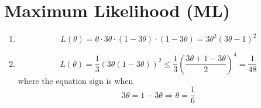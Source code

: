 
\section{Maximum Likelihood (ML)}

\begin{enumerate}
\item 
\[
L(\theta) = \theta\cdot 3\theta\cdot (1-3\theta)\cdot (1-3\theta) = 3\theta^2(3\theta-1)^2
\]
\item 
\[ L(\theta) = \frac{1}{3} (3\theta(1-3\theta))^2 \le \frac{1}{3} (\frac{3\theta+1-3\theta}{2})^4 = \frac{1}{48}
\]
where the equation sign is when
\[
3\theta = 1-3\theta \Rightarrow \theta = \frac{1}{6}
\]
\end{enumerate}